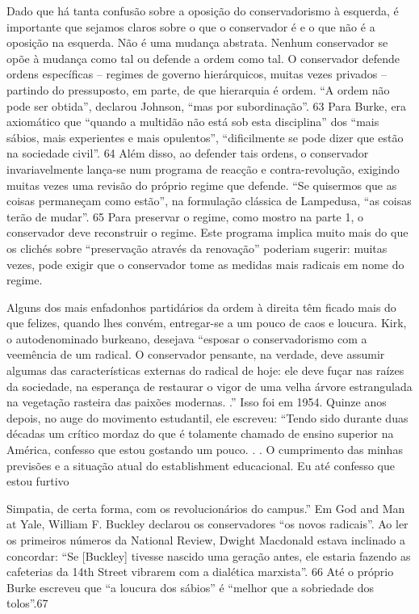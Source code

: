  \par 
Dado que há tanta confusão sobre a oposição do conservadorismo à esquerda, é importante que sejamos claros sobre o que o conservador é e o que não é a oposição na esquerda. Não é uma mudança abstrata. Nenhum conservador se opõe à mudança como tal ou defende a ordem como tal. O conservador defende ordens específicas – regimes de governo hierárquicos, muitas vezes privados – partindo do pressuposto, em parte, de que hierarquia é ordem. “A ordem não pode ser obtida”, declarou Johnson, “mas por subordinação”. {\color{blue}63} Para Burke, era axiomático que “quando a multidão não está sob esta disciplina” dos “mais sábios, mais experientes e mais opulentos”, “dificilmente se pode dizer que estão na sociedade civil”. {\color{blue}64} Além disso, ao defender tais ordens, o conservador invariavelmente lança-se num programa de reacção e contra-revolução, exigindo muitas vezes uma revisão do próprio regime que defende. “Se quisermos que as coisas permaneçam como estão”, na formulação clássica de Lampedusa, “as coisas terão de mudar”. {\color{blue}65} Para preservar o regime, como mostro na parte 1, o conservador deve reconstruir o regime. Este programa implica muito mais do que os clichés sobre “preservação através da renovação” poderiam sugerir: muitas vezes, pode exigir que o conservador tome as medidas mais radicais em nome do regime.
 \par 
Alguns dos mais enfadonhos partidários da ordem à direita têm ficado mais do que felizes, quando lhes convém, entregar-se a um pouco de caos e loucura. Kirk, o autodenominado burkeano, desejava “esposar o conservadorismo com a veemência de um radical. O conservador pensante, na verdade, deve assumir algumas das características externas do radical de hoje: ele deve fuçar nas raízes da sociedade, na esperança de restaurar o vigor de uma velha árvore estrangulada na vegetação rasteira das paixões modernas. .” Isso foi em 1954. Quinze anos depois, no auge do movimento estudantil, ele escreveu: “Tendo sido durante duas décadas um crítico mordaz do que é tolamente chamado de ensino superior na América, confesso que estou gostando um pouco. . . O cumprimento das minhas previsões e a situação atual do establishment educacional. Eu até confesso que estou furtivo
 \par 
Simpatia, de certa forma, com os revolucionários do campus.” Em God and Man at Yale, William F. Buckley declarou os conservadores “os novos radicais”. Ao ler os primeiros números da National Review, Dwight Macdonald estava inclinado a concordar: “Se [Buckley] tivesse nascido uma geração antes, ele estaria fazendo as cafeterias da 14th Street vibrarem com a dialética marxista”. {\color{blue}66} Até o próprio Burke escreveu que “a loucura dos sábios” é “melhor que a sobriedade dos tolos”.{\color{blue}67}
